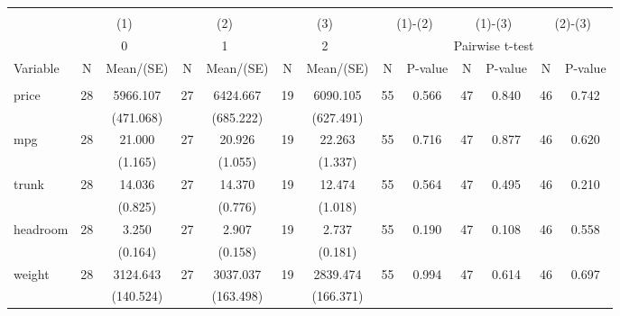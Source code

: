 
\begin{tabular}{@{\extracolsep{5pt}}lcccccccccccc}
\\[-1.8ex]\hline \hline \\[-1.8ex]
 & \multicolumn{2}{c}{(1)}  & \multicolumn{2}{c}{(2)}  & \multicolumn{2}{c}{(3)}  & \multicolumn{2}{c}{(1)-(2)} & \multicolumn{2}{c}{(1)-(3)} & \multicolumn{2}{c}{(2)-(3)} \\
 & \multicolumn{2}{c}{0}  & \multicolumn{2}{c}{1}  & \multicolumn{2}{c}{2}  & \multicolumn{6}{c}{Pairwise t-test}  \\
Variable & N & Mean/(SE) & N & Mean/(SE) & N & Mean/(SE) & N & P-value & N & P-value & N & P-value \\ \hline \\[-1.8ex] 
price   & 28    & 5966.107    & 27    & 6424.667    & 19    & 6090.105    & 55    & 0.566    & 47    & 0.840    & 46    & 0.742   \\
 &   & (471.068)  &   & (685.222)  &   & (627.491)  &   &  &   &  &   &  \\ [1ex]
mpg   & 28    & 21.000    & 27    & 20.926    & 19    & 22.263    & 55    & 0.716    & 47    & 0.877    & 46    & 0.620   \\
 &   & (1.165)  &   & (1.055)  &   & (1.337)  &   &  &   &  &   &  \\ [1ex]
trunk   & 28    & 14.036    & 27    & 14.370    & 19    & 12.474    & 55    & 0.564    & 47    & 0.495    & 46    & 0.210   \\
 &   & (0.825)  &   & (0.776)  &   & (1.018)  &   &  &   &  &   &  \\ [1ex]
headroom   & 28    & 3.250    & 27    & 2.907    & 19    & 2.737    & 55    & 0.190    & 47    & 0.108    & 46    & 0.558   \\
 &   & (0.164)  &   & (0.158)  &   & (0.181)  &   &  &   &  &   &  \\ [1ex]
weight   & 28    & 3124.643    & 27    & 3037.037    & 19    & 2839.474    & 55    & 0.994    & 47    & 0.614    & 46    & 0.697   \\
 &   & (140.524)  &   & (163.498)  &   & (166.371)  &   &  &   &  &   &  \\ [1ex]

\end{tabular}
